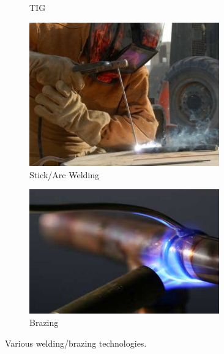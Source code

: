\documentclass[10pt,letterpaper]{book}
\begin{document}
\begin{figure}[H]
\begin{subfigure}[b]{.24\linewidth}
			\caption{TIG}
		\end{subfigure}\begin{subfigure}[b]{.24\linewidth}
			\includegraphics[width=0.9\textwidth]{imgs/arcweld.png}
			\caption{Stick/Arc Welding}
		\end{subfigure}\begin{subfigure}[b]{.24\linewidth}
			\includegraphics[width=0.9\textwidth]{imgs/braze.png}
			\caption{Brazing}
		\end{subfigure}
		\caption{Various welding/brazing technologies.}
	\end{figure}
 	
\end{document}
